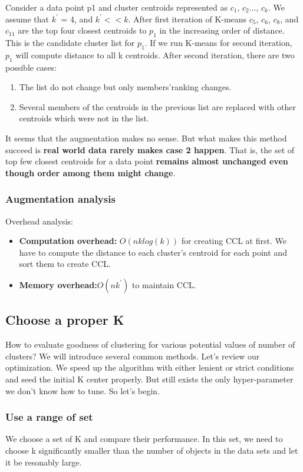 \documentclass[11pt]{article}
\begin{document}
Consider a data point p1 and cluster centroids represented as $c_1$, $c_2$..., $c_k$. We assume that $k^{\prime}$ = 4, and $k^{\prime} << k $. After first iteration of K-means $c_5$, $c_6$, $c_8$, and $c_{11}$ are the top four closest centroids to $p_1$ in the increasing order of distance. This is the candidate cluster list for $p_1$. If we run K-means for second iteration, $p_1$ will compute distance to all k centroids. After second iteration, there are two possible cases:
\begin{enumerate}
\item The list do not change but only members'ranking changes.
\item Several members of the centroids in the previous list are replaced with other centroids which were not in the list.
\end{enumerate}
It seems that the augmentation makes no sense. But what makes this method succeed is \textbf{real world data rarely makes case 2 happen}. That is, the set of top few closest centroids for a data point \textbf{remains almost unchanged even though order among them might change}.
\subsubsection{Augmentation analysis}
Overhead analysis:
\begin{itemize}
\item \textbf{Computation overhead:} $O(nklog(k))$ for creating CCL at first. We have to compute the distance to each cluster's centroid for each point and sort them to create CCL. 
\item \textbf{Memory overhead:}$ O(nk^{\prime})$ to maintain CCL.
\end{itemize}
\par

\subsection{Choose a proper K}
How to evaluate goodness of clustering for various potential values of number of clusters? We will introduce several common methods.\cite{datamining,inproceedings,articleToBound,doi:10.1243/095440605X8298} Let's review our optimization. We speed up the algorithm with either lenient or strict conditions and seed the initial K center properly. But still exists the only hyper-parameter we don't know how to tune. So let's begin. \par


\subsubsection{Use a range of set}
We choose a set of K and compare their performance. In this set, we need to choose k significantly smaller than the number of objects in the data sets and let it be resonably large.
\end{document}
